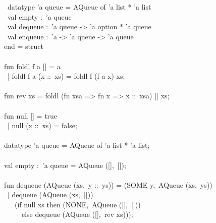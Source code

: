 \begin{isabellebody}
\begin{isamarkuptext}
\hspace*{0pt} ~datatype 'a queue = AQueue of 'a list * 'a list\\
\hspace*{0pt} ~val empty :~'a queue\\
\hspace*{0pt} ~val dequeue :~'a queue -> 'a option * 'a queue\\
\hspace*{0pt} ~val enqueue :~'a -> 'a queue -> 'a queue\\
\hspace*{0pt}end = struct\\
\hspace*{0pt}\\
\hspace*{0pt}fun foldl f a [] = a\\
\hspace*{0pt} ~| foldl f a (x ::~xs) = foldl f (f a x) xs;\\
\hspace*{0pt}\\
\hspace*{0pt}fun rev xs = foldl (fn xsa => fn x => x ::~xsa) [] xs;\\
\hspace*{0pt}\\
\hspace*{0pt}fun null [] = true\\
\hspace*{0pt} ~| null (x ::~xs) = false;\\
\hspace*{0pt}\\
\hspace*{0pt}datatype 'a queue = AQueue of 'a list * 'a list;\\
\hspace*{0pt}\\
\hspace*{0pt}val empty :~'a queue = AQueue ([],~[]);\\
\hspace*{0pt}\\
\hspace*{0pt}fun dequeue (AQueue (xs,~y ::~ys)) = (SOME y,~AQueue (xs,~ys))\\
\hspace*{0pt} ~| dequeue (AQueue (xs,~[])) =\\
\hspace*{0pt} ~~~(if null xs then (NONE,~AQueue ([],~[]))\\
\hspace*{0pt} ~~~~~else dequeue (AQueue ([],~rev xs)));\\

\end{isamarkuptext}
\end{isabellebody}
